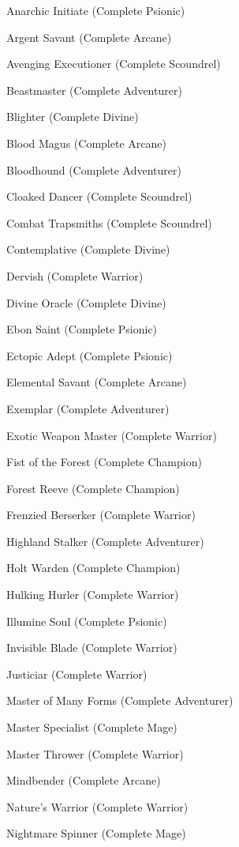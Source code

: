 \begin{itemize*}
\item Anarchic Initiate (Complete Psionic)
\item Argent Savant (Complete Arcane)
\item Avenging Executioner (Complete Scoundrel)
\item Beastmaster (Complete Adventurer)
\item Blighter (Complete Divine)
\item Blood Magus (Complete Arcane)
\item Bloodhound (Complete Adventurer)
\item Cloaked Dancer (Complete Scoundrel)
\item Combat Trapsmiths (Complete Scoundrel)
\item Contemplative (Complete Divine)
\item Dervish (Complete Warrior)
\item Divine Oracle (Complete Divine)
\item Ebon Saint (Complete Psionic)
\item Ectopic Adept (Complete Psionic)
\item Elemental Savant (Complete Arcane)
\item Exemplar (Complete Adventurer)
\item Exotic Weapon Master (Complete Warrior)
\item Fist of the Forest (Complete Champion)
\item Forest Reeve (Complete Champion)
\item Frenzied Berserker (Complete Warrior)
\item Highland Stalker (Complete Adventurer)
\item Holt Warden (Complete Champion)
\item Hulking Hurler (Complete Warrior)
\item Illumine Soul (Complete Psionic)
\item Invisible Blade (Complete Warrior)
\item Justiciar (Complete Warrior)
\item Master of Many Forms (Complete Adventurer)
\item Master Specialist (Complete Mage)
\item Master Thrower (Complete Warrior)
\item Mindbender (Complete Arcane)
\item Nature's Warrior (Complete Warrior)
\item Nightmare Spinner (Complete Mage)

\end{itemize*}
